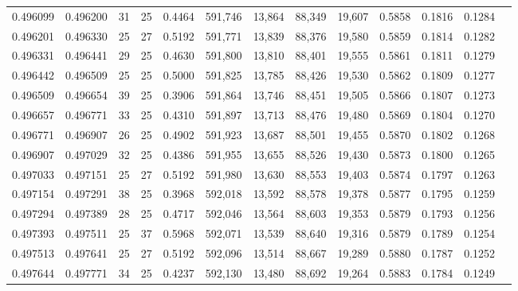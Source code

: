 \begin{tabular}{rrrrrrrrrrrrr}
0.496099 & 0.496200 &    31 &  25 &                                     0.4464 & 591,746 &  13,864 &  88,349 &  19,607 & 0.5858 & 0.1816 & 0.1284 \\
0.496201 & 0.496330 &    25 &  27 &                                     0.5192 & 591,771 &  13,839 &  88,376 &  19,580 & 0.5859 & 0.1814 & 0.1282 \\
0.496331 & 0.496441 &    29 &  25 &                                     0.4630 & 591,800 &  13,810 &  88,401 &  19,555 & 0.5861 & 0.1811 & 0.1279 \\
0.496442 & 0.496509 &    25 &  25 &                                     0.5000 & 591,825 &  13,785 &  88,426 &  19,530 & 0.5862 & 0.1809 & 0.1277 \\
0.496509 & 0.496654 &    39 &  25 &                                     0.3906 & 591,864 &  13,746 &  88,451 &  19,505 & 0.5866 & 0.1807 & 0.1273 \\
0.496657 & 0.496771 &    33 &  25 &                                     0.4310 & 591,897 &  13,713 &  88,476 &  19,480 & 0.5869 & 0.1804 & 0.1270 \\
0.496771 & 0.496907 &    26 &  25 &                                     0.4902 & 591,923 &  13,687 &  88,501 &  19,455 & 0.5870 & 0.1802 & 0.1268 \\
0.496907 & 0.497029 &    32 &  25 &                                     0.4386 & 591,955 &  13,655 &  88,526 &  19,430 & 0.5873 & 0.1800 & 0.1265 \\
0.497033 & 0.497151 &    25 &  27 &                                     0.5192 & 591,980 &  13,630 &  88,553 &  19,403 & 0.5874 & 0.1797 & 0.1263 \\
0.497154 & 0.497291 &    38 &  25 &                                     0.3968 & 592,018 &  13,592 &  88,578 &  19,378 & 0.5877 & 0.1795 & 0.1259 \\
0.497294 & 0.497389 &    28 &  25 &                                     0.4717 & 592,046 &  13,564 &  88,603 &  19,353 & 0.5879 & 0.1793 & 0.1256 \\
0.497393 & 0.497511 &    25 &  37 &                                     0.5968 & 592,071 &  13,539 &  88,640 &  19,316 & 0.5879 & 0.1789 & 0.1254 \\
0.497513 & 0.497641 &    25 &  27 &                                     0.5192 & 592,096 &  13,514 &  88,667 &  19,289 & 0.5880 & 0.1787 & 0.1252 \\
0.497644 & 0.497771 &    34 &  25 &                                     0.4237 & 592,130 &  13,480 &  88,692 &  19,264 & 0.5883 & 0.1784 & 0.1249 \\

\end{tabular}

